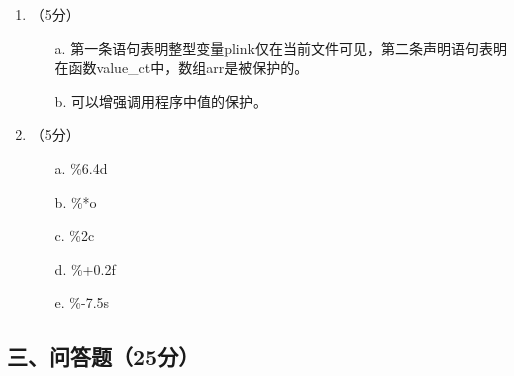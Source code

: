 \documentclass[8pt]{article}
\begin{document}
\begin{CJK}{UTF8}{gkai}
\begin{enumerate}
\item （5分）
\begin{itemize}
\item[a.]
第一条语句表明整型变量plink仅在当前文件可见，第二条声明语句表明在函数value\_ct中，数组arr是被保护的。
\item[b.] 
可以增强调用程序中值的保护。
\end{itemize}
\item （5分）

\begin{itemize}
\item[a.] \%6.4d 
\item[b.] \%*o 
\item[c.] \%2c 
\item[d.] \%+0.2f 
\item[e.] \%-7.5s
\end{itemize}   
\end{enumerate}


\subsection*{三、问答题（25分）}


\end{CJK}
\end{document}

